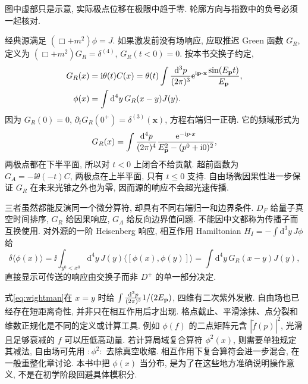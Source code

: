 \begin{center}
\end{center}
图中虚部只是示意, 实际极点位移在极限中趋于零. 轮廓方向与指数中的负号必须一起核对.

经典源满足 $(\Box+m^2)\phi=J$. 如果激发前没有场响应, 应取推迟 Green 函数 $G_R$, 定义为 $(\Box+m^2)G_R=\delta^{(4)}$, $G_R(t<0)=0$. 按本书交换子约定,
\begin{align*}
G_R(x)&=\mathrm i\theta(t)C(x)
=\theta(t)\int\frac{\mathrm d^3p}{(2\pi)^3}\mathrm e^{\mathrm i\mathbf p\cdot\mathbf x}\frac{\sin(E_{\mathbf p}t)}{E_{\mathbf p}},\\
\phi(x)&=\int\mathrm d^4y\,G_R(x-y)J(y).
\end{align*}
因为 $G_R(0)=0$, $\partial_tG_R(0^+)=\delta^{(3)}(\mathbf x)$, 方程右端归一正确. 它的频域形式为
\[
G_R(x)=\int\frac{\mathrm d^4p}{(2\pi)^4}\frac{\mathrm e^{-\mathrm i p\cdot x}}{E_{\mathbf p}^2-(p^0+\mathrm i0)^2},
\]
两极点都在下半平面, 所以对 $t<0$ 上闭合不给贡献. 超前函数为 $G_A=-\ii\theta(-t)C$, 两极点在上半平面, 只有 $t\le0$ 支持. 自由场微因果性进一步保证 $G_R$ 在未来光锥之外也为零, 因而源的响应不会超光速传播.

三者虽然都能反演同一个微分算符, 却具有不同右端归一和边界条件. $D_F$ 给量子真空时间排序, $G_R$ 给因果响应, $G_A$ 给反向边界值问题. 不能因中文都称为传播子而互换使用. 对外源的一阶 Heisenberg 响应, 相互作用 Hamiltonian $H_I=-\int\mathrm d^3y\,J\phi$ 给
\[
\delta\langle\phi(x)\rangle=
\ii\int_{y^0<x^0}\mathrm d^4y\,J(y)\langle[\phi(x),\phi(y)]\rangle
=\int\mathrm d^4y\,G_R(x-y)J(y),
\]
直接显示可传送的响应由交换子而非 $D^+$ 的单一部分决定.

式\eqref{eq:wightman}在 $x=y$ 时给 $\int\frac{\mathrm d^3p}{(2\pi)^3}1/(2E_{\mathbf p})$, 四维有二次紫外发散. 自由场也已经存在短距离奇性, 并非只在相互作用后才出现. 格点截止、平滑涂抹、点分裂和维数正规化是不同的定义或计算工具. 例如 $\phi(f)$ 的二点矩阵元含 $|\widetilde f(p)|^2$, 光滑且足够衰减的 $f$ 可以压低高动量. 若计算局域复合算符 $\phi^2(x)$, 则需要单独规定其减法, 自由场可先用 $:\phi^2:$ 去除真空收缩. 相互作用下复合算符会进一步混合, 在一般重整化章讨论. 本书中把 $\phi(x)$ 当分布, 是为了在这些地方准确说明操作意义, 不是在初学阶段回避具体模积分.
